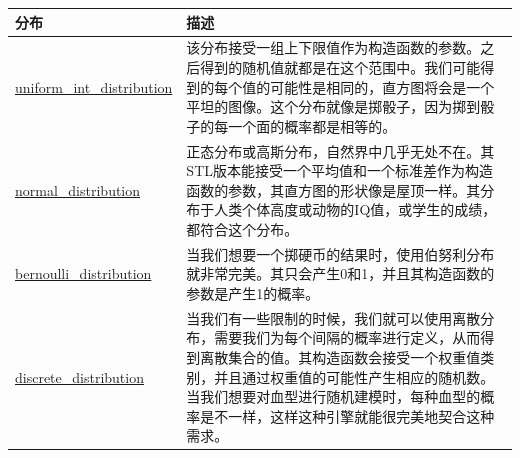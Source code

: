 \begin{table}[htbp]\centering
\begin{tabularx}{\textwidth}{lX}
\toprule
分布 & 描述 \\
\midrule
\href{http://zh.cppreference.com/w/cpp/numeric/random/uniform_int_distribution}{uniform\_int\_distribution} & 该分布接受一组上下限值作为构造函数的参数。之后得到的随机值就都是在这个范围中。我们可能得到的每个值的可能性是相同的，直方图将会是一个平坦的图像。这个分布就像是掷骰子，因为掷到骰子的每一个面的概率都是相等的。 \\
\href{http://zh.cppreference.com/w/cpp/numeric/random/normal_distribution}{normal\_distribution} & 正态分布或高斯分布，自然界中几乎无处不在。其STL版本能接受一个平均值和一个标准差作为构造函数的参数，其直方图的形状像是屋顶一样。其分布于人类个体高度或动物的IQ值，或学生的成绩，都符合这个分布。 \\
\href{http://zh.cppreference.com/w/cpp/numeric/random/bernoulli_distribution}{bernoulli\_distribution} & 当我们想要一个掷硬币的结果时，使用伯努利分布就非常完美。其只会产生0和1，并且其构造函数的参数是产生1的概率。 \\
\href{http://zh.cppreference.com/w/cpp/numeric/random/discrete_distribution}{discrete\_distribution} & 当我们有一些限制的时候，我们就可以使用离散分布，需要我们为每个间隔的概率进行定义，从而得到离散集合的值。其构造函数会接受一个权重值类别，并且通过权重值的可能性产生相应的随机数。当我们想要对血型进行随机建模时，每种血型的概率是不一样，这样这种引擎就能很完美地契合这种需求。 \\
\bottomrule
\end{tabularx}
\end{table}


